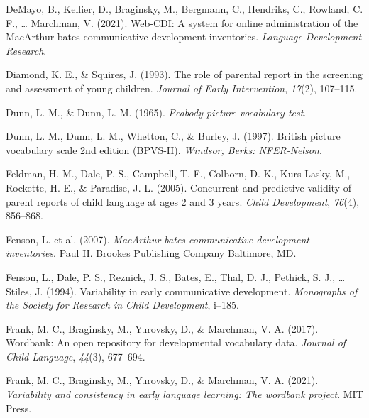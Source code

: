\documentclass[
  man,floatsintext]{apa6}
\newlength{\cslhangindent}
\newlength{\cslentryspacingunit} %
\newenvironment{CSLReferences}[2] %
 {%
  \setlength{\parindent}{0pt}
  \ifodd #1
  \let\oldpar\par
  \def\par{\hangindent=\cslhangindent\oldpar}
  \fi
  \setlength{\parskip}{#2\cslentryspacingunit}
 }%
 {}
\begin{document}
\begin{CSLReferences}{1}{0}
\leavevmode{}%
DeMayo, B., Kellier, D., Braginsky, M., Bergmann, C., Hendriks, C., Rowland, C. F., \ldots{} Marchman, V. (2021). Web-CDI: A system for online administration of the MacArthur-bates communicative development inventories. \emph{Language Development Research}.

\leavevmode{}%
Diamond, K. E., \& Squires, J. (1993). The role of parental report in the screening and assessment of young children. \emph{Journal of Early Intervention}, \emph{17}(2), 107--115.

\leavevmode{}%
Dunn, L. M., \& Dunn, L. M. (1965). \emph{Peabody picture vocabulary test}.

\leavevmode{}%
Dunn, L. M., Dunn, L. M., Whetton, C., \& Burley, J. (1997). British picture vocabulary scale 2nd edition (BPVS-II). \emph{Windsor, Berks: NFER-Nelson}.

\leavevmode{}%
Feldman, H. M., Dale, P. S., Campbell, T. F., Colborn, D. K., Kurs-Lasky, M., Rockette, H. E., \& Paradise, J. L. (2005). Concurrent and predictive validity of parent reports of child language at ages 2 and 3 years. \emph{Child Development}, \emph{76}(4), 856--868.

\leavevmode{}%
Fenson, L. et al. (2007). \emph{MacArthur-bates communicative development inventories}. Paul H. Brookes Publishing Company Baltimore, MD.

\leavevmode{}%
Fenson, L., Dale, P. S., Reznick, J. S., Bates, E., Thal, D. J., Pethick, S. J., \ldots{} Stiles, J. (1994). Variability in early communicative development. \emph{Monographs of the Society for Research in Child Development}, i--185.

\leavevmode{}%
Frank, M. C., Braginsky, M., Yurovsky, D., \& Marchman, V. A. (2017). Wordbank: An open repository for developmental vocabulary data. \emph{Journal of Child Language}, \emph{44}(3), 677--694.

\leavevmode{}%
Frank, M. C., Braginsky, M., Yurovsky, D., \& Marchman, V. A. (2021). \emph{Variability and consistency in early language learning: The wordbank project}. MIT Press.


\end{CSLReferences}
\end{document}
